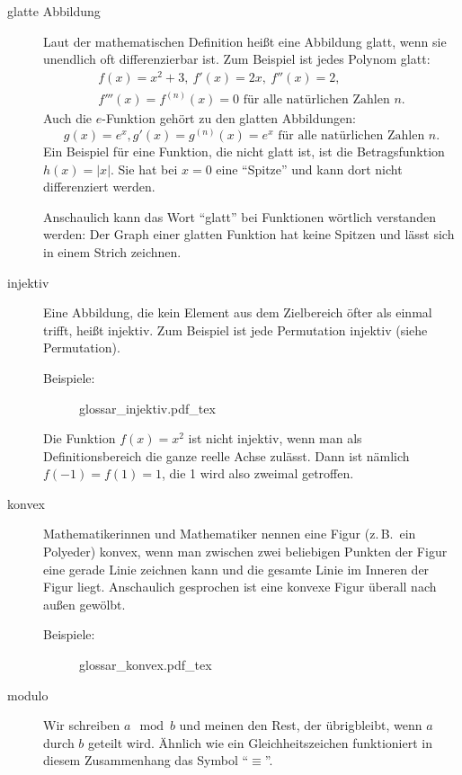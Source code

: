 \begin{description}
	\item[glatte Abbildung] Laut der mathematischen Definition heißt eine Abbildung glatt, wenn sie unendlich oft differenzierbar ist.
		Zum \nopagebreak Beispiel ist jedes Polynom glatt:
		\begin{gather*}
			f(x) = x^2 + 3,\ f'(x) = 2x,\ f''(x) = 2,\\
			f'''(x) = f^{(n)}(x) = 0 \text{ für alle natürlichen Zahlen } n.
		\end{gather*}
		Auch die $e$-Funktion gehört zu den glatten Abbildungen:
		\begin{equation*}
			g(x) = e^x, g'(x) = g^{(n)}(x) = e^x \text{ für alle natürlichen Zahlen } n.
		\end{equation*}
		Ein Beispiel für eine Funktion, die nicht glatt ist, ist die Betragsfunktion $h(x) = |x|.$ Sie hat bei $x=0$ eine \enquote{Spitze} und kann dort nicht differenziert werden.

		Anschaulich kann das Wort \enquote{glatt} bei Funktionen wörtlich verstanden werden: Der Graph einer glatten Funktion hat keine Spitzen und lässt sich in einem Strich zeichnen.

	\item[injektiv] Eine Abbildung, die kein Element aus dem Zielbereich öfter als einmal trifft, heißt injektiv. Zum Beispiel ist jede Permutation injektiv (siehe Permutation).

		Beispiele:
		\begin{figure}
			\def\svgwidth{200pt}
			{glossar_injektiv.pdf_tex}
		\end{figure}
		Die Funktion $f(x) = x^2$ ist nicht injektiv, wenn man als Definitionsbereich die ganze reelle Achse zulässt. Dann ist nämlich $f(-1) = f(1) = 1$, die 1 wird also zweimal getroffen.

	\item[konvex] Mathematikerinnen und Mathematiker nennen eine Figur (z.\,B.\ ein Polyeder) konvex, wenn man zwischen zwei beliebigen Punkten der Figur eine gerade Linie zeichnen kann und die gesamte Linie im Inneren der Figur liegt.
		Anschaulich gesprochen ist eine konvexe Figur überall nach außen gewölbt.

		Beispiele:
		\begin{figure}
			\def\svgwidth{270pt}
			{glossar_konvex.pdf_tex}
		\end{figure}
	\item[modulo] Wir schreiben $a \mod b$ und meinen den Rest, der übrigbleibt, wenn $a$ durch $b$ geteilt wird.
		Ähnlich wie ein Gleichheitszeichen funktioniert in diesem Zusammenhang das Symbol \enquote{$\equiv$}.


\end{description}
